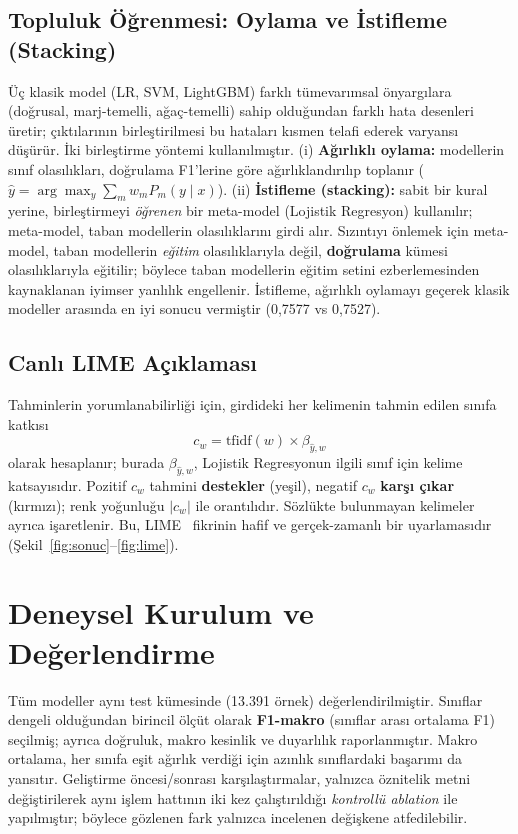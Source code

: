 \documentclass[conference]{IEEEtran}
\begin{document}
\subsection{Topluluk Öğrenmesi: Oylama ve İstifleme (Stacking)}
Üç klasik model (LR, SVM, LightGBM) farklı tümevarımsal önyargılara (doğrusal,
marj-temelli, ağaç-temelli) sahip olduğundan farklı hata desenleri üretir;
çıktılarının birleştirilmesi bu hataları kısmen telafi ederek varyansı düşürür. İki
birleştirme yöntemi kullanılmıştır. (i) \textbf{Ağırlıklı oylama:} modellerin sınıf
olasılıkları, doğrulama F1'lerine göre ağırlıklandırılıp toplanır
($\hat{y}=\arg\max_y \sum_m w_m P_m(y\mid x)$). (ii) \textbf{İstifleme (stacking):}
sabit bir kural yerine, birleştirmeyi \emph{öğrenen} bir meta-model (Lojistik
Regresyon) kullanılır; meta-model, taban modellerin olasılıklarını girdi alır.
Sızıntıyı önlemek için meta-model, taban modellerin \emph{eğitim} olasılıklarıyla
değil, \textbf{doğrulama} kümesi olasılıklarıyla eğitilir; böylece taban modellerin
eğitim setini ezberlemesinden kaynaklanan iyimser yanlılık engellenir. İstifleme,
ağırlıklı oylamayı geçerek klasik modeller arasında en iyi sonucu vermiştir
(0,7577 vs 0,7527).

\subsection{Canlı LIME Açıklaması}
Tahminlerin yorumlanabilirliği için, girdideki her kelimenin tahmin edilen sınıfa
katkısı
\[
c_w = \mathrm{tfidf}(w)\times \beta_{\hat{y},w}
\]
olarak hesaplanır; burada $\beta_{\hat{y},w}$, Lojistik Regresyonun ilgili sınıf
için kelime katsayısıdır. Pozitif $c_w$ tahmini \textbf{destekler} (yeşil),
negatif $c_w$ \textbf{karşı çıkar} (kırmızı); renk yoğunluğu $|c_w|$ ile
orantılıdır. Sözlükte bulunmayan kelimeler ayrıca işaretlenir. Bu, LIME~\cite{lime}
fikrinin hafif ve gerçek-zamanlı bir uyarlamasıdır
(Şekil~\ref{fig:sonuc}--\ref{fig:lime}).

\section{Deneysel Kurulum ve Değerlendirme}
Tüm modeller aynı test kümesinde (13.391 örnek) değerlendirilmiştir. Sınıflar
dengeli olduğundan birincil ölçüt olarak \textbf{F1-makro} (sınıflar arası
ortalama F1) seçilmiş; ayrıca doğruluk, makro kesinlik ve duyarlılık
raporlanmıştır. Makro ortalama, her sınıfa eşit ağırlık verdiği için azınlık
sınıflardaki başarımı da yansıtır. Geliştirme öncesi/sonrası karşılaştırmalar,
yalnızca öznitelik metni değiştirilerek aynı işlem hattının iki kez çalıştırıldığı
\emph{kontrollü ablation} ile yapılmıştır; böylece gözlenen fark yalnızca incelenen
değişkene atfedilebilir.
\end{document}
